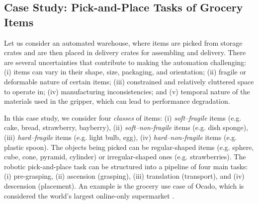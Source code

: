 \documentclass[lettersize,journal]{IEEEtran}
\begin{document}
\subsection{Case Study: Pick-and-Place Tasks of Grocery Items}
Let us consider an automated warehouse, where items are picked from storage crates and are then placed in delivery crates for assembling and delivery. 
There are several uncertainties that contribute to making the automation challenging: (i) items can vary in their shape, size, packaging, and orientation; (ii) fragile or deformable nature of certain items; (iii) constrained and relatively cluttered space to operate in; (iv) manufacturing inconsistencies; and (v) temporal nature of the materials used in the gripper, which can lead to performance degradation. 

In this case study, we consider four \emph{classes} of items: (i) \emph{soft–fragile} items (e.g. cake, bread, strawberry, bayberry), (ii) \emph{soft–non-fragile} items (e.g. dish sponge), (iii) \emph{hard–fragile} items (e.g. light bulb, egg), (iv) \emph{hard–non-fragile} items (e.g. plastic spoon). 
The objects being picked can be regular-shaped items (e.g. sphere, cube, cone, pyramid, cylinder) or irregular-shaped ones (e.g. strawberries).
The robotic pick-and-place task can be structured into a pipeline of four main tasks: (i) pre-grasping, (ii) ascension (grasping), (iii) translation (transport), and (iv) descension (placement). 
An example is the grocery use case of Ocado, which is considered the world's largest online-only supermarket \cite{Triantafyllou2019, Sotiropoulos2018}. 

\end{document}
